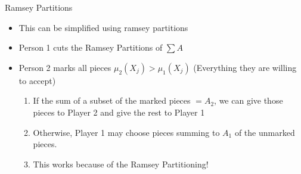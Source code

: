 \documentclass[aspectratio=169,xcolor=dvipsnames]{beamer}
\begin{document}
\begin{frame}{Ramsey Partitions}
	\begin{itemize}
		\item This can be simplified using ramsey partitions
		\item Person 1 cuts the Ramsey Partitions of $\sum A$
		\item Person 2 marks all pieces $\mu_2(X_j) > \mu_1(X_j)$ (Everything they are willing to accept)\pause
		\begin{enumerate}
			\item If the sum of a subset of the marked pieces $= A_2$, we can give those pieces to Player 2 and give the rest to Player 1\pause 
			\item Otherwise, Player 1 may choose pieces summing to $A_1$ of the unmarked pieces. 
			\item This works because of the Ramsey Partitioning!
		\end{enumerate}
	\end{itemize}
\end{frame}
\end{document}
